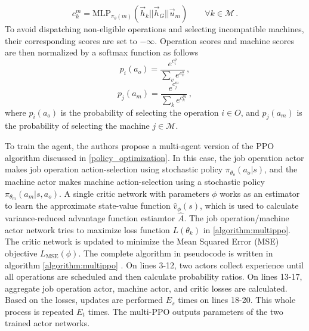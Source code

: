 \begin{equation}
    c^{m}_k = \text{MLP}_{\pi_{\theta}(m)} \left ( \vec{h}_k || \vec{h}_G || \vec{u}_m \right ) \hspace{2em} \forall k \in \mathcal{M} \, .
\end{equation}
To avoid dispatching non-eligible operations and selecting incompatible machines, their corresponding scores are set to $-\infty$. Operation scores and machine scores are then normalized by a softmax function as follows \cite{LEI2022117796}
\begin{equation}
    p_i (a_o) = \frac{e^{c^o_i}}{\sum_v e^{c^o_v}} \, ,
\end{equation}
\begin{equation}
    p_j (a_m) = \frac{e^{c^m_j}}{\sum_k e^{c^m_k}} \, ,
\end{equation}
where $p_i (a_o)$ is the probability of selecting the operation $i \in O$, and $p_j (a_m)$ is the probability of selecting the machine $j \in \mathcal{M}$.\\
\par
To train the agent, the authors propose a multi-agent version of the PPO algorithm discussed in \ref{policy_optimization}. In this case, the job operation actor makes job operation action-selection using stochastic policy $\pi_{\theta_o}(a_o|s)$, and the machine actor makes machine action-selection using a stochastic policy $\pi_{\theta_m}(a_m | s, a_o)$. A single critic network with parameters $\phi$ works as an estimator to learn the approximate state-value function $\hat{v}_\phi(s)$, which is used to calculate variance-reduced advantage function estiamtor $\hat{A}$. The job operation/machine actor network tries to maximize loss function $L(\theta_k)$ in \ref{algorithm:multippo}. The critic network is updated to minimize the Mean Squared Error (MSE) objective $L_\text{MSE}(\phi)$. The complete algorithm in pseudocode is written in algorithm \ref{algorithm:multippo} \cite{LEI2022117796}. On lines 3-12, two actors collect experience until all operations are scheduled and then calculate probability ratios. On lines 13-17, aggregate job operation actor, machine actor, and critic losses are calculated. Based on the losses, updates are performed $E_s$ times on lines 18-20. This whole process is repeated $E_t$ times. The multi-PPO outputs parameters of the two trained actor networks.

